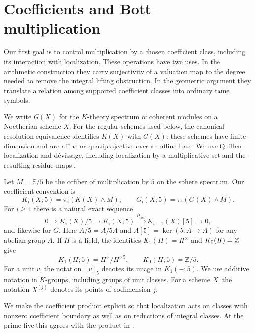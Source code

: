 \section{Coefficients and Bott multiplication}
\label{sec:coefficients}

Our first goal is to control multiplication by a chosen coefficient
class, including its interaction with localization. These operations
have two uses. In the arithmetic construction they carry surjectivity
of a valuation map to the degree needed to remove the integral lifting
obstruction. In the geometric argument they translate a relation among
supported coefficient classes into ordinary tame symbols.

We write $G(X)$ for the $K$-theory spectrum of coherent modules on a
Noetherian scheme $X$.  For the regular schemes used below, the canonical
resolution equivalence identifies $K(X)$ with $G(X)$: these schemes have
finite dimension and are affine or quasiprojective over an affine base.
We use Quillen
localization and d\'evissage, including localization by a multiplicative
set and the resulting residue maps
\cite[\S4, Theorem~3 and Corollary~2; \S5, Theorems~4--5;
\S7, Proposition~3.2 and paragraph~3.4]{Quillen1973Higher}.

Let $M=\mathbb S/5$ be the cofiber of multiplication by $5$ on the sphere
spectrum.  Our coefficient convention is
\[
 K_i(X;5)=\pi_i(K(X)\wedge M),\qquad
 G_i(X;5)=\pi_i(G(X)\wedge M).
\]
For $i\geq1$ there is a natural exact sequence
\begin{equation}
\label{eq:coefficient-sequence}
 0\longrightarrow K_i(X)/5\longrightarrow K_i(X;5)
 \xrightarrow{\partial_{\mathrm{coef}}}K_{i-1}(X)[5]
 \longrightarrow0,
\end{equation}
and likewise for $G$. Here $A/5=A/5A$ and $A[5]=\ker(5:A\to A)$ for any abelian group $A$. If $H$ is a field, the identities $K_1(H)=H^\times$ and $K_0(H)=\mathbb Z$ give
\begin{equation}
\label{eq:low-coefficients}
 K_1(H;5)=H^\times/H^{\times5},\qquad K_0(H;5)=\mathbb Z/5.
\end{equation}
For a unit $v$, the notation $[v]_5$ denotes its image in $K_1(-;5)$.
We use additive notation in $K$-groups, including groups of unit classes.
For a scheme $X$, the notation $X^{(j)}$ denotes its points of codimension $j$.

We make the coefficient product explicit so that localization acts on
classes with nonzero coefficient boundary as well as on reductions of
integral classes. At the prime five this agrees with the product in
\cite[Proposition~16.1 and Theorem~16.2]{FriedlanderSuslin2002}.

